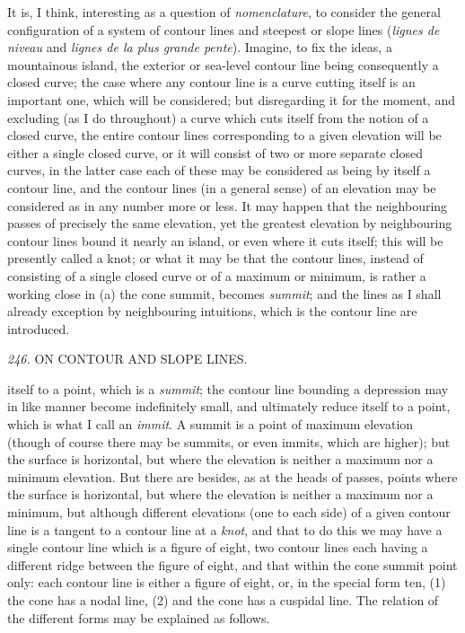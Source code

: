\documentclass[11pt,a4paper]{article}
\begin{document}
\medskip

It is, I think, interesting as a question of \textit{nomenclature}, to consider the general configuration of a system of contour lines and steepest or slope lines (\textit{lignes de niveau} and \textit{lignes de la plus grande pente}). Imagine, to fix the ideas, a mountainous island, the exterior or sea-level contour line being consequently a closed curve; the case where any contour line is a curve cutting itself is an important one, which will be considered; but disregarding it for the moment, and excluding (as I do throughout) a curve which cuts itself from the notion of a closed curve, the entire contour lines corresponding to a given elevation will be either a single closed curve, or it will consist of two or more separate closed curves, in the latter case each of these may be considered as being by itself a contour line, and the contour lines (in a general sense) of an elevation may be considered as in any number more or less. It may happen that the neighbouring passes of precisely the same elevation, yet the greatest elevation by neighbouring contour lines bound it nearly an island, or even where it cuts itself; this will be presently called a knot; or what it may be that the contour lines, instead of consisting of a single closed curve or of a maximum or minimum, is rather a working close in (a) the cone summit, becomes \textit{summit}; and the lines as I shall already exception by neighbouring intuitions, which is the contour line are introduced.

\setcounter{page}{109}

\noindent\textit{246.} \quad ON CONTOUR AND SLOPE LINES.

itself to a point, which is a \textit{summit}; the contour line bounding a depression may in like manner become indefinitely small, and ultimately reduce itself to a point, which is what I call an \textit{immit}. A summit is a point of maximum elevation (though of course there may be summits, or even immits, which are higher); but the surface is horizontal, but where the elevation is neither a maximum nor a minimum elevation. But there are besides, as at the heads of passes, points where the surface is horizontal, but where the elevation is neither a maximum nor a minimum, but although different elevations (one to each side) of a given contour line is a tangent to a contour line at a \textit{knot}, and that to do this we may have a single contour line which is a figure of eight, two contour lines each having a different ridge between the figure of eight, and that within the cone summit point only: each contour line is either a figure of eight, or, in the special form ten, (1) the cone has a nodal line, (2) and the cone has a cuspidal line. The relation of the different forms may be explained as follows.
\end{document}
